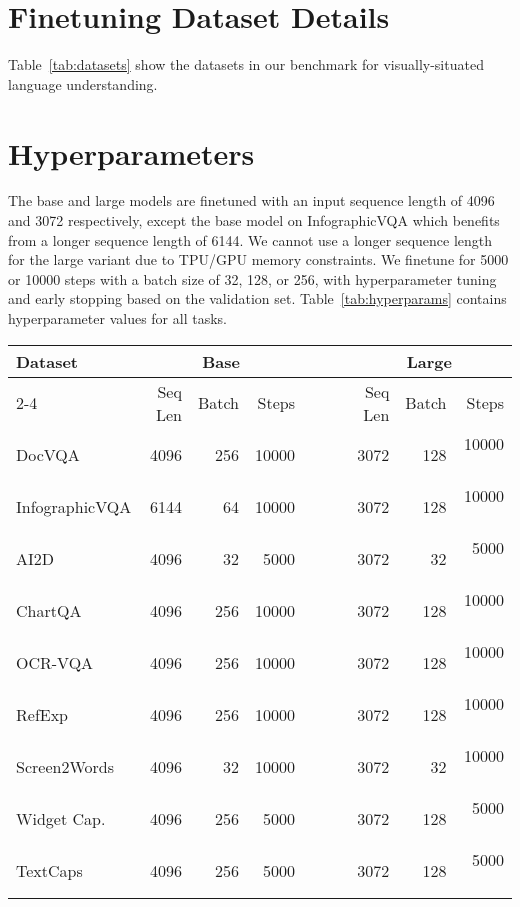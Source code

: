 \documentclass{article} \usepackage[accepted]{icml2023}
\begin{document}
\pagebreak
\section{Finetuning Dataset Details}
\label{sec:finetuning_datasets}
Table~\ref{tab:datasets} show the datasets in our benchmark for visually-situated language understanding.


\clearpage
\section{Hyperparameters}
\label{sec:hyperparams}
The base and large models are finetuned with an input sequence length of 4096 and 3072 respectively, except the base model on InfographicVQA which benefits from a longer sequence length of 6144. We cannot use a longer sequence length for the large variant due to TPU/GPU memory constraints. 
We finetune for 5000 or 10000 steps with a batch size of 32, 128, or 256, with hyperparameter tuning and early stopping based on the validation set. Table~\ref{tab:hyperparams} contains hyperparameter values for all tasks.

\begin{table*}[t]
\centering
\begin{tabular}{ l r r r c r r r} 
\toprule
\multirow{3}{*}{Dataset} & \multicolumn{3}{c}{Base} &~~~& \multicolumn{3}{c}{Large}\\
\cmidrule{2-4}\cmidrule{6-8}
& Seq Len & Batch & Steps & & Seq Len & Batch & Steps \\
\midrule
DocVQA & 4096 & 256 & 10000 & & 3072 & 128 & 10000 ~\\
InfographicVQA & 6144 & 64 & 10000 & & 3072 & 128 & 10000 ~\\
AI2D & 4096 & 32 & 5000 & & 3072 & 32 & 5000 ~\\
ChartQA & 4096 & 256 & 10000 & & 3072 & 128 & 10000 ~\\
OCR-VQA & 4096 & 256 & 10000 & & 3072 & 128 & 10000 ~\\
RefExp & 4096 & 256 & 10000 & & 3072 & 128 & 10000 ~\\
Screen2Words & 4096 & 32 & 10000 & & 3072 & 32 & 10000 ~\\
Widget Cap. & 4096 & 256 & 5000 & & 3072 & 128 & 5000 ~\\
TextCaps & 4096 & 256 & 5000 & & 3072 & 128 & 5000 ~\\
\bottomrule
\end{tabular}
\caption{Model hyperparameters}
\label{tab:hyperparams}
\end{table*}
\end{document}
